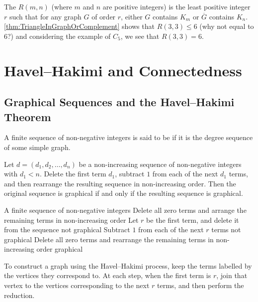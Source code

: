 The  $R(m, n)$ (where $m$ and $n$ are positive integers) is the least positive integer $r$ such that for any graph $G$ of order $r$, either $G$ contains $K_m$ or $\overline G$ contains $K_n$. \cref{thm:TriangleInGraphOrComplement} shows that $R(3, 3) \le 6$ (why not equal to $6$?) and considering the example of $C_5$, we see that $R(3, 3) = 6$.

\section{Havel--Hakimi and Connectedness}\label{sec:HavelHakimiConnectedness}

\subsection{Graphical Sequences and the Havel--Hakimi Theorem}

A finite sequence of non-negative integers is said to be  if it is the degree sequence of some simple graph.

\begin{Theorem}\label{thm:HavelHakimi}
Let $d = (d_1, d_2, \ldots, d_n)$ be a non-increasing sequence of non-negative integers with $d_1 < n$. Delete the first term $d_1$, subtract $1$ from each of the next $d_1$ terms, and then rearrange the resulting sequence in non-increasing order. Then the original sequence is graphical if and only if the resulting sequence is graphical.
\end{Theorem}

\begin{algorithm}
\caption{Havel--Hakimi test}\label{alg:HavelHakimi}
\begin{algorithmic}[1]
\Require A finite sequence of non-negative integers
\State Delete all zero terms and arrange the remaining terms in non-increasing order
    \State Let $r$ be the first term, and delete it from the sequence
        \State \Return not graphical
    \EndIf
    \State Subtract $1$ from each of the next $r$ terms
        \State \Return not graphical
    \EndIf
    \State Delete all zero terms and rearrange the remaining terms in non-increasing order
\EndWhile
\State \Return graphical
\end{algorithmic}
\end{algorithm}

To construct a graph using the Havel--Hakimi process, keep the terms labelled by the vertices they correspond to. At each step, when the first term is $r$, join that vertex to the vertices corresponding to the next $r$ terms, and then perform the reduction.

